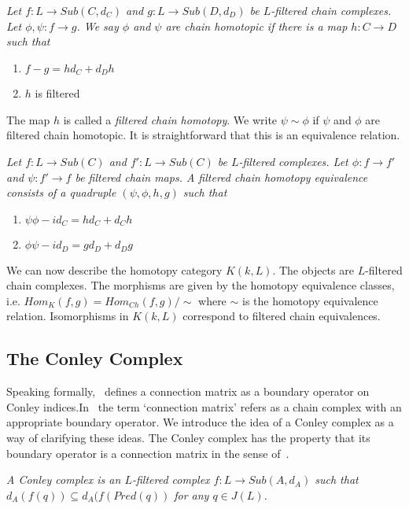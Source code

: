 \begin{defn}
{\em
Let $f:L\to Sub(C,d_C)$ and $g:L\to Sub(D,d_D)$ be $L$-filtered chain complexes.  Let $\phi,\psi:f\to g$.  We say $\phi$ and $\psi$ are {\em chain homotopic} if there is a map $h:C\to D$ such that
\begin{enumerate}
\item $f-g = hd_C+d_Dh$
\item $h$ is filtered
\end{enumerate}  
}
\end{defn}

The map $h$ is called a {\em filtered chain homotopy}.  We write $\psi\sim \phi$ if $\psi$ and $\phi$ are filtered chain homotopic.  It is straightforward that this is an equivalence relation.  

\begin{defn}
{\em
Let $f:L\to Sub(C)$ and $f':L\to Sub(C)$ be $L$-filtered complexes.  Let $\phi:f\to f'$ and $\psi:f'\to f$ be filtered chain maps.  A {\em filtered chain homotopy equivalence} consists of a quadruple $(\psi,\phi,h,g)$ such that 
\begin{enumerate}
\item $\psi\phi-id_C= hd_C + d_Ch$
\item $\phi\psi-id_D = gd_D+d_Dg$
\end{enumerate}
}
\end{defn}


We can now describe the homotopy category $K(k,L)$.  The objects are $L$-filtered chain complexes.  The morphisms are given by the homotopy equivalence classes, i.e. $Hom_K(f,g) = Hom_{Ch}(f,g)/\sim$ where $\sim$ is the homotopy equivalence relation.   Isomorphisms in $K(k,L)$ correspond to filtered chain equivalences.




\subsection{The Conley Complex}

Speaking formally,~\cite{fran} defines a connection matrix as a boundary operator on Conley indices.In~\cite{salamon} the term `connection matrix' refers as a chain complex with an appropriate boundary operator.    We introduce the idea of a Conley complex as a way of clarifying these ideas.  The Conley complex has the property that its boundary operator is a connection matrix in the sense of~\cite{fran}.   

\begin{defn}
{\em A Conley complex is an $L$-filtered complex $f:L\to Sub(A,d_A)$ such that $d_A(f(q))\subseteq d_A(f(Pred(q))$ for any $q\in J(L)$.
}
\end{defn}

